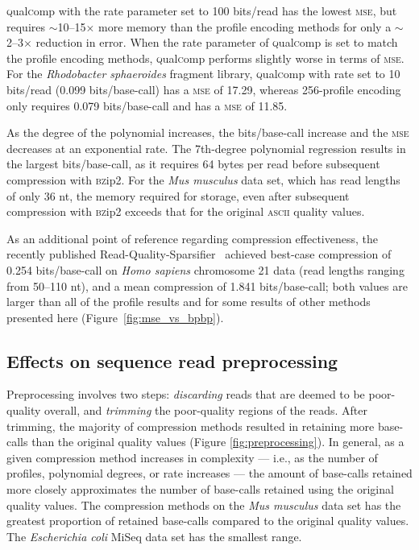 \documentclass{bioinfo}
\begin{document}
\textsc{q}ual\textsc{c}omp with the rate parameter set to 100
bits/read has the lowest \textsc{mse}, but requires
$\sim$10--15$\times$ more memory than the profile encoding methods for
only a $\sim$2--3$\times$ reduction in error. When the rate parameter
of \textsc{q}ual\textsc{c}omp is set to match the profile encoding
methods, \textsc{q}ual\textsc{c}omp performs slightly worse in terms
of \textsc{mse}. For the \textit{Rhodobacter sphaeroides} fragment
library, \textsc{q}ual\textsc{c}omp with rate set to 10 bits/read
(0.099 bits/base-call) has a \textsc{mse} of 17.29, whereas
256-profile encoding only requires 0.079 bits/base-call and has a
\textsc{mse} of 11.85.

As the degree of the polynomial increases, the bits/base-call increase
and the \textsc{mse} decreases at an exponential rate. The 7th-degree
polynomial regression results in the largest bits/base-call, as it
requires 64 bytes per read before subsequent compression with
\textsc{bz}ip2. For the \textit{Mus musculus} data set, which has read
lengths of only 36 nt, the memory required for storage, even after
subsequent compression with \textsc{bz}ip2 exceeds that for the
original \textsc{ascii} quality values.

As an additional point of reference regarding compression
effectiveness, the recently published
Read-Quality-Sparsifier~\citep{DBLP:conf/recomb/YuYB14} achieved
best-case compression of 0.254 bits/base-call on \textit{Homo sapiens}
chromosome 21 data (read lengths ranging from 50--110 nt), and a mean
compression of 1.841 bits/base-call; both values are larger than all
of the profile results and for some results of other methods presented
here (Figure~\ref{fig:mse_vs_bpbp}).

\subsection{Effects on sequence read preprocessing}

Preprocessing involves two steps: \emph{discarding} reads that are
deemed to be poor-quality overall, and \emph{trimming} the
poor-quality regions of the reads. After trimming, the majority of
compression methods resulted in retaining more base-calls than the
original quality values (Figure \ref{fig:preprocessing}). In general,
as a given compression method increases in complexity --- i.e., as the
number of profiles, polynomial degrees, or rate increases --- the
amount of base-calls retained more closely approximates the number of
base-calls retained using the original quality values. The compression
methods on the \textit{Mus musculus} data set has the greatest
proportion of retained base-calls compared to the original quality
values. The \textit{Escherichia coli} MiSeq data set has the smallest
range.
\end{document}

